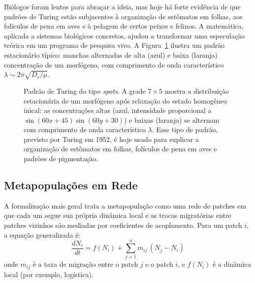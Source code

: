Biólogos foram lentos para abraçar a ideia, mas hoje há forte evidência de
que padrões de Turing estão subjacentes à organização de estômatos em
folhas, aos folículos de pena em aves e à pelagem de certos peixes e
felinos. A matemática, aplicada a sistemas biológicos concretos, ajudou a
transformar uma especulação teórica em um programa de pesquisa vivo. A
Figura~\ref{fig:10-turing} ilustra um padrão estacionário típico: manchas
alternadas de alta (azul) e baixa (laranja) concentração de um morfógeno,
com comprimento de onda característico $\lambda \sim 2\pi\sqrt{D_v/\mu}$.

\begin{figure}[htbp]
\centering
{}
\caption{Padrão de Turing do tipo \emph{spots}. A grade $7 \times 5$ mostra a distribuição estacionária de um morfógeno após relaxação do estado homogêneo inical: as concentrações altas (azul, intensidade proporcional a $\sin(60x+45)\sin(60y+30)$) e baixas (laranja) se alternam com comprimento de onda característico $\lambda$. Esse tipo de padrão, previsto por Turing em 1952, é hoje usado para explicar a organização de estômatos em folhas, folículos de pena em aves e padrões de pigmentação.}
\label{fig:10-turing}
\end{figure}

\subsection{Metapopulações em Rede}
\label{sub:image10-metapop-network}

A formalização mais geral trata a metapopulação como uma rede de patches em
que cada um segue sua própria dinâmica local e as trocas migratórias entre
patches vizinhos são mediadas por coeficientes de acoplamento. Para um patch
$i$, a equação generalizada é:
\begin{equation}
\frac{d N_i}{dt} = f(N_i) + \sum_{j=1}^{n} m_{ij}\,(N_j - N_i)
\end{equation}
onde $m_{ij}$ é a taxa de migração entre o patch $j$ e o patch $i$, e
$f(N_i)$ é a dinâmica local (por exemplo, logística).

